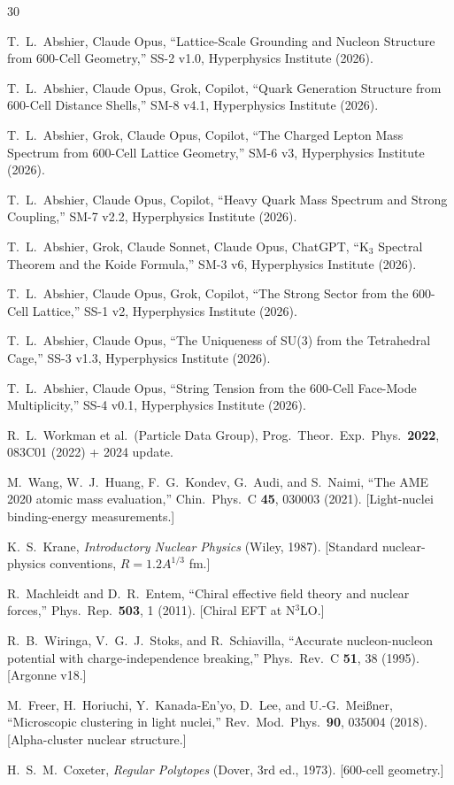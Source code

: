 \documentclass[11pt,letterpaper]{article}
\begin{document}
\begin{thebibliography}{30}

T.~L.~Abshier, Claude Opus, ``Lattice-Scale Grounding and Nucleon Structure from 600-Cell Geometry,'' SS-2 v1.0, Hyperphysics Institute (2026).

T.~L.~Abshier, Claude Opus, Grok, Copilot, ``Quark Generation Structure from 600-Cell Distance Shells,'' SM-8 v4.1, Hyperphysics Institute (2026).

T.~L.~Abshier, Grok, Claude Opus, Copilot, ``The Charged Lepton Mass Spectrum from 600-Cell Lattice Geometry,'' SM-6 v3, Hyperphysics Institute (2026).

T.~L.~Abshier, Claude Opus, Copilot, ``Heavy Quark Mass Spectrum and Strong Coupling,'' SM-7 v2.2, Hyperphysics Institute (2026).

T.~L.~Abshier, Grok, Claude Sonnet, Claude Opus, ChatGPT, ``K$_3$ Spectral Theorem and the Koide Formula,'' SM-3 v6, Hyperphysics Institute (2026).

T.~L.~Abshier, Claude Opus, Grok, Copilot, ``The Strong Sector from the 600-Cell Lattice,'' SS-1 v2, Hyperphysics Institute (2026).

T.~L.~Abshier, Claude Opus, ``The Uniqueness of SU(3) from the Tetrahedral Cage,'' SS-3 v1.3, Hyperphysics Institute (2026).

T.~L.~Abshier, Claude Opus, ``String Tension from the 600-Cell Face-Mode Multiplicity,'' SS-4 v0.1, Hyperphysics Institute (2026).

R.~L.~Workman et al.\ (Particle Data Group), Prog.\ Theor.\ Exp.\ Phys.\ \textbf{2022}, 083C01 (2022) + 2024 update.

M.~Wang, W.~J.~Huang, F.~G.~Kondev, G.~Audi, and S.~Naimi, ``The AME 2020 atomic mass evaluation,'' Chin.\ Phys.\ C \textbf{45}, 030003 (2021). [Light-nuclei binding-energy measurements.]

K.~S.~Krane, \emph{Introductory Nuclear Physics} (Wiley, 1987). [Standard nuclear-physics conventions, $R = 1.2 A^{1/3}$ fm.]

R.~Machleidt and D.~R.~Entem, ``Chiral effective field theory and nuclear forces,'' Phys.\ Rep.\ \textbf{503}, 1 (2011). [Chiral EFT at N$^3$LO.]

R.~B.~Wiringa, V.~G.~J.~Stoks, and R.~Schiavilla, ``Accurate nucleon-nucleon potential with charge-independence breaking,'' Phys.\ Rev.\ C \textbf{51}, 38 (1995). [Argonne v18.]

M.~Freer, H.~Horiuchi, Y.~Kanada-En'yo, D.~Lee, and U.-G.~Mei{\ss}ner, ``Microscopic clustering in light nuclei,'' Rev.\ Mod.\ Phys.\ \textbf{90}, 035004 (2018). [Alpha-cluster nuclear structure.]

H.~S.~M.~Coxeter, \emph{Regular Polytopes} (Dover, 3rd ed., 1973). [600-cell geometry.]

\end{thebibliography}
\end{document}
